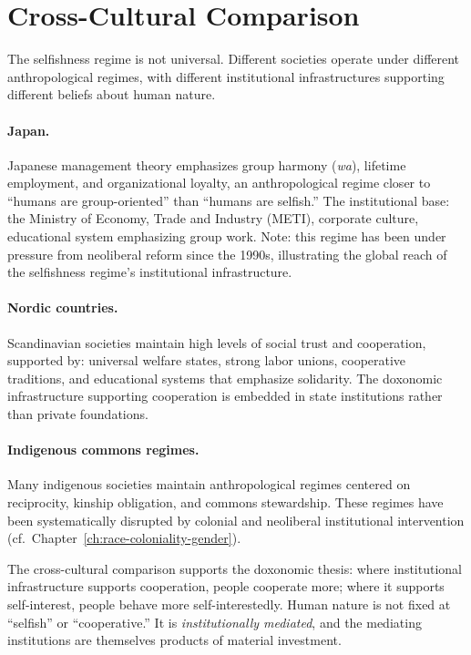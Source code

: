 \section{Cross-Cultural Comparison}
\label{sec:ch21-cross-cultural}

The selfishness regime is not universal.
Different societies operate under different anthropological regimes, with different institutional infrastructures supporting different beliefs about human nature.

\paragraph{Japan.}
Japanese management theory emphasizes group harmony (\emph{wa}), lifetime employment, and organizational loyalty, an anthropological regime closer to ``humans are group-oriented'' than ``humans are selfish.''
The institutional base: the Ministry of Economy, Trade and Industry (METI), corporate culture, educational system emphasizing group work.
Note: this regime has been under pressure from neoliberal reform since the 1990s, illustrating the global reach of the selfishness regime's institutional infrastructure.

\paragraph{Nordic countries.}
Scandinavian societies maintain high levels of social trust and cooperation, supported by: universal welfare states, strong labor unions, cooperative traditions, and educational systems that emphasize solidarity.
The doxonomic infrastructure supporting cooperation is embedded in state institutions rather than private foundations.

\paragraph{Indigenous commons regimes.}
Many indigenous societies maintain anthropological regimes centered on reciprocity, kinship obligation, and commons stewardship.
These regimes have been systematically disrupted by colonial and neoliberal institutional intervention (cf.\ Chapter~\ref{ch:race-coloniality-gender}).

The cross-cultural comparison supports the doxonomic thesis: where institutional infrastructure supports cooperation, people cooperate more; where it supports self-interest, people behave more self-interestedly.
Human nature is not fixed at ``selfish'' or ``cooperative.'' It is \emph{institutionally mediated}, and the mediating institutions are themselves products of material investment.

